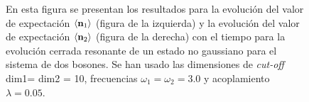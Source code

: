 \documentclass{report} %
\newcommand{\lgg}{\langle}
\newcommand{\rgg}{\rangle}
\numberwithin{equation}{section}
\begin{document}
\begin{figure}
    \centering
    \qquad
    \caption{En esta figura se presentan los resultados para la evolución del valor de expectación $\lgg {\bf n}_1 \rgg$ (figura de la izquierda) y la evolución del valor de expectación $\lgg {\bf n}_2 \rgg$ (figura de la derecha) con el tiempo para la evolución cerrada resonante de un estado no gaussiano para el sistema de dos bosones. Se han usado las dimensiones de \textit{cut-off} dim1= dim2 = 10, frecuencias $\omega_1 = \omega_2 = 3.0$ y acoplamiento $\lambda = 0.05$.}
    \label{ocupations_closed_res}
\end{figure}
\end{document}

